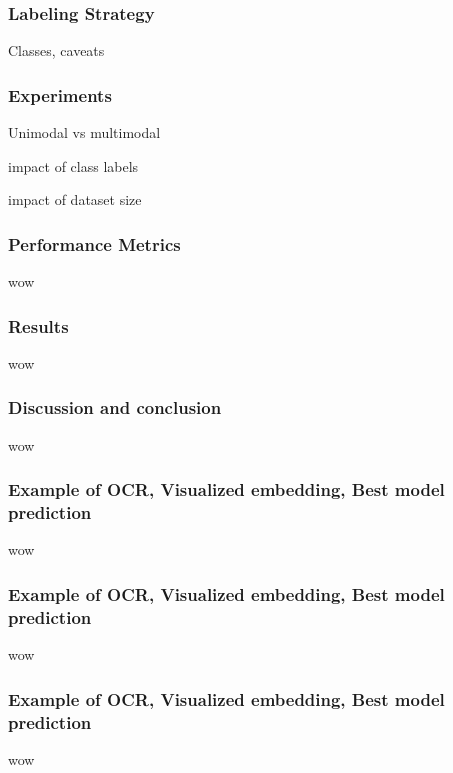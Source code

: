 \documentclass[aspectratio=1610]{beamer}
\begin{document}
\begin{frame}
  \frametitle{Labeling Strategy}
Classes, caveats
\end{frame}
\normalpage


\begin{frame}
  \frametitle{Experiments}
Unimodal vs multimodal

impact of class labels

impact of dataset size

\end{frame}
\normalpage


\begin{frame}
  \frametitle{Performance Metrics}
wow
\end{frame}
\normalpage


\begin{frame}
  \frametitle{Results}
wow
\end{frame}
\normalpage

\begin{frame}
  \frametitle{Discussion and conclusion}
wow
\end{frame}
\normalpage

\begin{frame}
  \frametitle{Example of OCR, Visualized embedding, Best model prediction}
wow
\end{frame}
\normalpage

\begin{frame}
  \frametitle{Example of OCR, Visualized embedding, Best model prediction}
wow
\end{frame}
\normalpage

\begin{frame}
  \frametitle{Example of OCR, Visualized embedding, Best model prediction}
wow
\end{frame}
\normalpage
\end{document}
